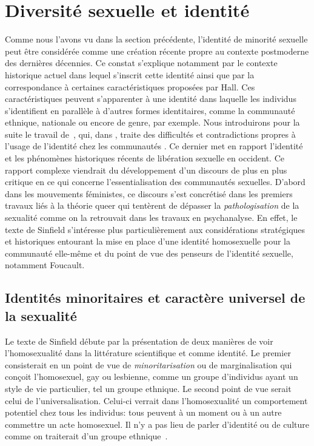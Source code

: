 \section{Diversité sexuelle et identité}
\label{sec:diversit_sexuelle_et_identit_} Comme nous l'avons vu dans la section précédente, l'identité de minorité sexuelle peut être considérée comme une création récente propre au contexte postmoderne des dernières décennies.
Ce constat s'explique notamment par le contexte historique actuel dans lequel s'inscrit cette identité ainsi que par la correspondance à certaines caractéristiques proposées par Hall.
Ces caractéristiques peuvent s'apparenter à une identité dans laquelle les individus s'identifient en parallèle à d'autres formes identitaires, comme la communauté ethnique, nationale ou encore de genre, par exemple.
Nous introduirons pour la suite le travail de~\citet{Sinfield1996}, qui, dans , traite des difficultés et contradictions propres à l'usage de l'identité chez les communautés \lgbt{}.
Ce dernier met en rapport l'identité et les phénomènes historiques récents de libération sexuelle en occident.
Ce rapport complexe viendrait du développement d'un discours de plus en plus critique en ce qui concerne l'essentialisation des communautés sexuelles.
D'abord dans les mouvements féministes, ce discours s'est concrétisé dans les premiers travaux liés à la théorie queer qui tentèrent de dépasser la \emph{pathologisation} de la sexualité comme on la retrouvait dans les travaux en psychanalyse.
En effet, le texte de Sinfield s'intéresse plus particulièrement aux considérations stratégiques et historiques entourant la mise en place d'une identité homosexuelle pour la communauté elle-même et du point de vue des penseurs de l'identité sexuelle, notamment Foucault.

\subsection{Identités minoritaires et caractère universel de la sexualité}
\label{sub:minorit_s_et_universel}
Le texte de Sinfield débute par la présentation de deux manières de voir l'homosexualité dans la littérature scientifique et comme identité.
Le premier consisterait en un point de vue de \emph{minoritarisation} ou de marginalisation qui conçoit l'homosexuel, gay ou lesbienne, comme un groupe d'individus ayant un style de vie particulier, tel un groupe ethnique.
Le second point de vue serait celui de l'universalisation.
Celui-ci verrait dans l'homosexualité un comportement potentiel chez tous les individus: tous peuvent à un moment ou à un autre commettre un acte homosexuel.
Il n'y a pas lieu de parler d'identité ou de culture comme on traiterait d'un groupe ethnique~\citep[271]{Sinfield1996}.


